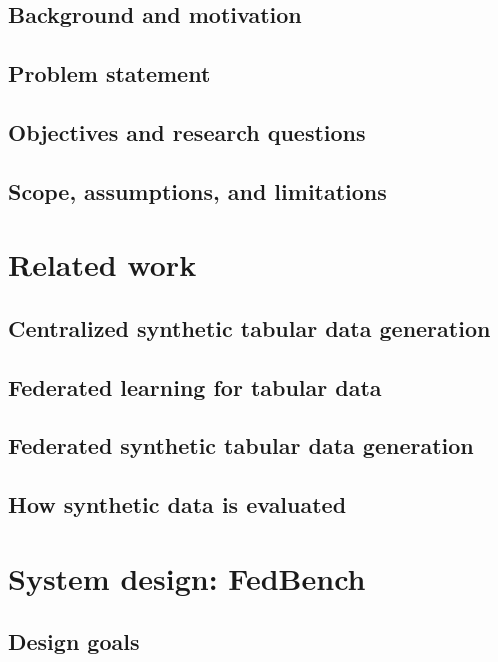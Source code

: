 \documentclass{article}
\begin{document}
\subsection{Background and motivation}

\subsection{Problem statement}

\subsection{Objectives and research questions}

\subsection{Scope, assumptions, and limitations}

\section{Related work}

\subsection{Centralized synthetic tabular data generation}

\subsection{Federated learning for tabular data}

\subsection{Federated synthetic tabular data generation}

\subsection{How synthetic data is evaluated}

\section{System design: FedBench}

\subsection{Design goals}
\end{document}
